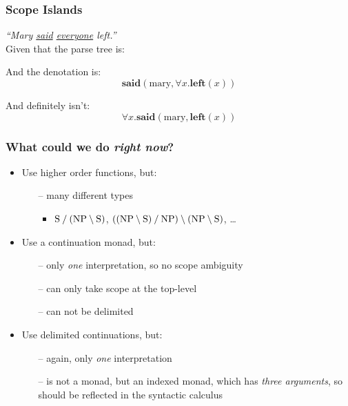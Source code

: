 \documentclass[12pt,t]{beamer}
\begin{document}
\begin{frame}
  \frametitle{Scope Islands}
  \textit{``Mary \underline{said} \underline{everyone} left.''}
  \\[0.125\baselineskip]
  Given that the parse tree is:
  \\[1\baselineskip]
  \begin{center}
  \end{center}
  \begin{minipage}{0.5\linewidth}
    And the denotation is:
    $$\mathbf{said}(\text{mary},\forall x.\mathbf{left}(x))$$
  \end{minipage}%
  \begin{minipage}{0.5\linewidth}
    And definitely isn't:
    $$\forall x.\mathbf{said}(\text{mary},\mathbf{left}(x))$$
  \end{minipage}
  \vfill
\end{frame}

\begin{frame}
  \frametitle{What could we do \textit{right now}?}
  \vfill
  \begin{itemize}
  \item
    Use higher order functions, but:
    \begin{itemize}
    \item[--] many different types
      \begin{itemize}
      \item
        $\text{S}\mathbin{\slash}(\text{NP}\mathbin{\backslash}\text{S})$,
        $((\text{NP}\mathbin{\backslash}\text{S})\mathbin{\slash}\text{NP})\mathbin{\backslash}(\text{NP}\mathbin{\backslash}\text{S})$,
        \ldots
      \end{itemize}
    \end{itemize}
  \item
    Use a continuation monad, but:
    \begin{itemize}
    \item[--] only \textit{one} interpretation, so no scope ambiguity
    \item[--] can only take scope at the top-level
    \item[--] can not be delimited
    \end{itemize}
  \item
    Use delimited continuations, but:
    \begin{itemize}
    \item[--] again, only \textit{one} interpretation
    \item[--] is not a monad, but an indexed monad, which has
      \textit{three arguments}, so should be reflected in the
      syntactic calculus
    \end{itemize}
  \end{itemize}
  \vfill
\end{frame}
\end{document}
